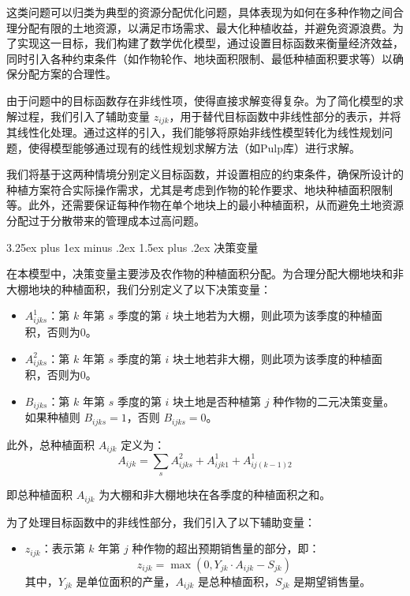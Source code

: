 \documentclass[12pt,a4paper]{nmmcm}
\makeatletter
\renewcommand\subsection{\@startsection{subsection}{2}{0pt}%
    {3.25ex plus 1ex minus .2ex}%
    {1.5ex plus .2ex}%
    {\normalfont\Large\bfseries}}
\makeatother
\begin{document}
这类问题可以归类为典型的资源分配优化问题，具体表现为如何在多种作物之间合理分配有限的土地资源，以满足市场需求、最大化种植收益，并避免资源浪费。为了实现这一目标，我们构建了数学优化模型，通过设置目标函数来衡量经济效益，同时引入各种约束条件（如作物轮作、地块面积限制、最低种植面积要求等）以确保分配方案的合理性。

由于问题中的目标函数存在非线性项，使得直接求解变得复杂。为了简化模型的求解过程，我们引入了辅助变量 $z_{ijk}$，用于替代目标函数中非线性部分的表示，并将其线性化处理。通过这样的引入，我们能够将原始非线性模型转化为线性规划问题，使得模型能够通过现有的线性规划求解方法（如Pulp库）进行求解。

我们将基于这两种情境分别定义目标函数，并设置相应的约束条件，确保所设计的种植方案符合实际操作需求，尤其是考虑到作物的轮作要求、地块种植面积限制等。此外，还需要保证每种作物在单个地块上的最小种植面积，从而避免土地资源分配过于分散带来的管理成本过高问题。

\subsection{决策变量}

在本模型中，决策变量主要涉及农作物的种植面积分配。为合理分配大棚地块和非大棚地块的种植面积，我们分别定义了以下决策变量：
\begin{itemize}
  \item $A^1_{ijks}$：第 $k$ 年第 $s$ 季度的第 $i$ 块土地若为大棚，则此项为该季度的种植面积，否则为0。
  \item $A^2_{ijks}$：第 $k$ 年第 $s$ 季度的第 $i$ 块土地若非大棚，则此项为该季度的种植面积，否则为0。
  \item $B_{ijks}$：第 $k$ 年第 $s$ 季度的第 $i$ 块土地是否种植第 $j$ 种作物的二元决策变量。如果种植则 $B_{ijks} = 1$，否则 $B_{ijks} = 0$。
\end{itemize}

此外，总种植面积 $A_{ijk}$ 定义为：
\[
  A_{ijk} = \sum_s A^2_{ijks} + A^1_{ijk1} + A^1_{ij(k-1)2}
\]

即总种植面积 $A_{ijk}$ 为大棚和非大棚地块在各季度的种植面积之和。

为了处理目标函数中的非线性部分，我们引入了以下辅助变量：
\begin{itemize}
  \item $z_{ijk}$：表示第 $k$ 年第 $j$ 种作物的超出预期销售量的部分，即：
        \[
          z_{ijk} = \max(0, Y_{jk} \cdot A_{ijk} - S_{jk})
        \]
        其中，$Y_{jk}$ 是单位面积的产量，$A_{ijk}$ 是总种植面积，$S_{jk}$ 是期望销售量。
\end{itemize}
\end{document}
